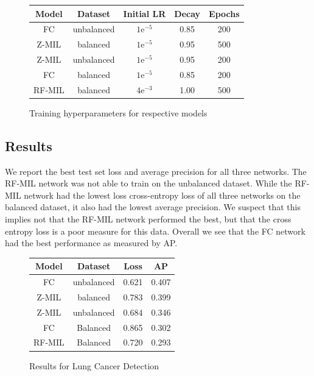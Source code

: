 \documentclass[twocolumn,10pt]{article}
\begin{document}
\begin{figure}[H]
\label{lung_results}
\begin{center}
\newcommand{\e}{\mbox{e}}
\begin{tabular}{|c|c|c|c|c|}
\hline 
Model & Dataset & Initial LR& Decay& Epochs \\
\hline
FC & unbalanced &  $1\e^{-5}$ & 0.85 & 200 \\
Z-MIL & balanced & $1\e^{-5}$ & 0.95 & 500 \\
Z-MIL & unbalanced &  $1\e^{-5}$ & 0.95 & 200 \\
FC & balanced & $1\e^{-5}$ & 0.85  & 200 \\
RF-MIL & balanced & $4\e^{-3}$ & 1.00 & 500 \\ %
\hline
\end{tabular}
\end{center}
\caption{Training hyperparameters for respective models}
\end{figure}




\subsection{Results}

We report the best test set loss and average precision for all three networks. The RF-MIL network was not able to train on the unbalanced dataset. While the RF-MIL network had the lowest loss cross-entropy loss of all three networks on the balanced dataset, it also had the lowest average precision. We suspect that this implies not that the RF-MIL network performed the best, but that the cross entropy loss is a poor measure for this data. Overall we see that the FC network had the best performance as measured by AP. 

\begin{figure}[H]
\label{lung_results}
\begin{center}
\begin{tabular}{|c|c|c|c|}
\hline 
Model & Dataset & Loss& AP \\
\hline
FC & unbalanced &  0.621 & 0.407 \\ %
Z-MIL & balanced & 0.783 & 0.399 \\ %
Z-MIL & unbalanced &  0.684 & 0.346 \\ %
FC & Balanced & 0.865 & 0.302 \\ %
RF-MIL & Balanced & 0.720 & 0.293 \\ %
\hline
\end{tabular}
\end{center}
\caption{Results for Lung Cancer Detection}
\end{figure}
\end{document}
